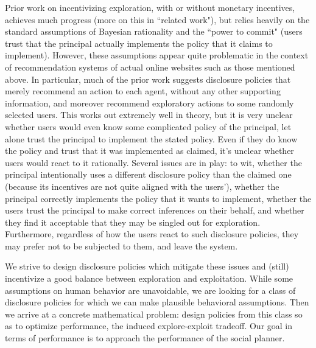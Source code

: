  Prior work on incentivizing exploration, with or without monetary incentives, achieves much progress (more on this in ``related work"), but relies heavily on the standard assumptions of Bayesian rationality and the ``power to commit" (\ie users trust that the principal actually implements the policy that it claims to implement). However, these assumptions appear quite problematic in the context of recommendation systems of actual online websites such as those mentioned above. In particular, much of the prior work suggests disclosure policies that merely recommend an action to each agent, without any other supporting information, and moreover recommend exploratory actions to some randomly selected users. This works out extremely well in theory, but it is very unclear whether users would even know some complicated policy of the principal, let alone trust the principal to implement the stated policy. Even if they do know the policy and trust that it was implemented as claimed, it's unclear whether users would react to it rationally.
%
Several issues are in play: to wit, whether the principal intentionally uses a different disclosure policy than the claimed one (\eg because its incentives are not quite aligned with the users'), whether the principal correctly implements the policy that it wants to implement, whether the users trust the principal to make correct inferences on their behalf, and whether they find it acceptable that they may be singled out for exploration. Furthermore, regardless of how the users react to such disclosure policies, they may prefer not to be subjected to them, and leave the system.

We strive to design disclosure policies which mitigate these issues and (still) incentivize a good balance between exploration and exploitation. While some assumptions on human behavior are unavoidable, we are looking for a class of disclosure policies for which we can make plausible behavioral assumptions. Then we arrive at a concrete mathematical problem: design policies from this class so as to optimize performance, \ie  the induced explore-exploit tradeoff. Our goal in terms of performance is to approach the performance of the social planner.

